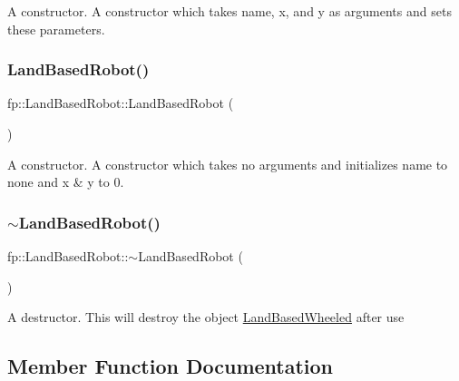 A constructor. A constructor which takes name, x, and y as arguments and sets these parameters. \mbox{\label{classfp_1_1_land_based_robot_a3e16cc74a11f831186978ef27eca7b99}} 
\subsubsection{\texorpdfstring{Land\+Based\+Robot()}{LandBasedRobot()}\hspace{0.1cm}{\footnotesize\ttfamily [2/2]}}
{\footnotesize\ttfamily fp\+::\+Land\+Based\+Robot\+::\+Land\+Based\+Robot (\begin{DoxyParamCaption}{ }\end{DoxyParamCaption})}

A constructor. A constructor which takes no arguments and initializes name to none and x \& y to 0. \mbox{\label{classfp_1_1_land_based_robot_ad62091990dd9e40e9c68f7c52914be93}} 
\subsubsection{\texorpdfstring{$\sim$\+Land\+Based\+Robot()}{~LandBasedRobot()}}
{\footnotesize\ttfamily fp\+::\+Land\+Based\+Robot\+::$\sim$\+Land\+Based\+Robot (\begin{DoxyParamCaption}{ }\end{DoxyParamCaption})}

A destructor. This will destroy the object \hyperlink{classfp_1_1_land_based_wheeled}{Land\+Based\+Wheeled} after use 

\subsection{Member Function Documentation}
\mbox{\label{classfp_1_1_land_based_robot_a68844e9c442d1b293945144dc6c6608c}} 
